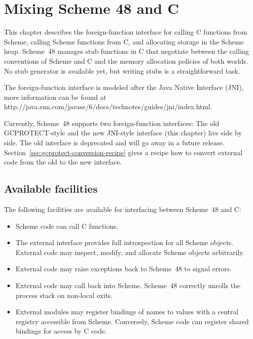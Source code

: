 \chapter{Mixing Scheme 48 and C}
\label{external-chapter}

This chapter describes the foreign-function interface for calling C
functions from Scheme, calling Scheme functions from C, and allocating
storage in the Scheme heap.  Scheme~48 manages stub functions in C
that negotiate between the calling conventions of Scheme and C and the
memory allocation policies of both worlds.  No stub generator is
available yet, but writing stubs is a straightforward task.

The foreign-function interface is modeled after the Java Native
Interface (JNI), more information can be found at
{http://java.sun.com/javase/6/docs\-/technotes/guides/jni/index.html}.

Currently, Scheme~48 supports two foreign-function interfaces: The old
GCPROTECT-style and the new JNI-style interface (this chapter) live
side by side.  The old interface is deprecated and will go away in a
future release.  Section~\ref{sec:gcprotect-conversion-recipe} gives a
recipe how to convert external code from the old to the new interface.

\section{Available facilities}
\label{sec:facilities}

The following facilities are available for interfacing between
 Scheme~48 and C:
%
\begin{itemize}
\item Scheme code can call C functions.
\item The external interface provides full introspection for all
  Scheme objects.  External code may inspect, modify, and allocate
  Scheme objects arbitrarily.
\item External code may raise exceptions back to Scheme~48 to
  signal errors.
\item External code may call back into Scheme.  Scheme~48
  correctly unrolls the process stack on non-local exits.
\item External modules may register bindings of names to values with a 
  central registry accessible from
  Scheme.  Conversely, Scheme code can register shared
  bindings for access by C code.
\end{itemize}


